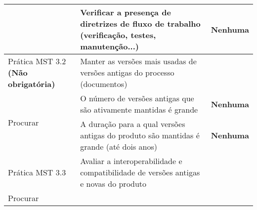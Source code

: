 \begin{longtable}{|p{2cm}|p{7cm}|p{7cm}|}
  \cline{2-3} & Verificar a presença de diretrizes de fluxo de
  trabalho (verificação, testes, manutenção...) &\textbf{Nenhuma} \\
  \hline \cellcolor[gray]{0.9} Prática MST 3.2 \textbf{(Não
    obrigatória)} & \cellcolor[gray]{0.9} Manter as versões mais
  usadas de versões
  antigas do processo (documentos) & \\
  \hline \multirow{2}{*}{Procurar} & O número de versões antigas que
  são ativamente mantidas é grande & \textbf{Nenhuma} \\
  \cline{2-3} & A duração para a qual versões antigas do produto são
  mantidas é grande (até dois anos) &\textbf{Nenhuma} \\
  \hline \cellcolor[gray]{0.9} Prática MST 3.3 & \cellcolor[gray]{0.9}
  Avaliar a interoperabilidade e
  compatibilidade de versões antigas e novas do produto & \\
  \hline \multirow{1}{*}{Procurar} & & \\
  \hline
\end{longtable}

